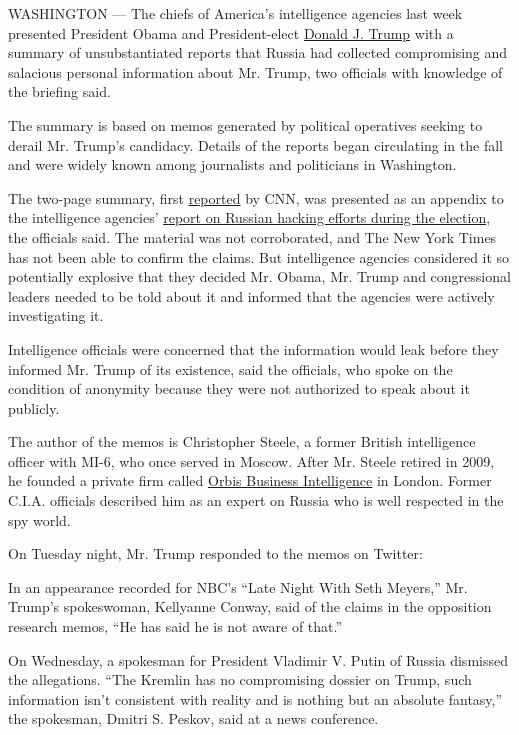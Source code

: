 WASHINGTON --- The chiefs of America's intelligence agencies last week
presented President Obama and President-elect
\href{http://www.nytimes.com/topic/person/donald-trump?inline=nyt-per}{Donald
J. Trump} with a summary of unsubstantiated reports that Russia had
collected compromising and salacious personal information about Mr.
Trump, two officials with knowledge of the briefing said.

The summary is based on memos generated by political operatives seeking
to derail Mr. Trump's candidacy. Details of the reports began
circulating in the fall and were widely known among journalists and
politicians in Washington.

The two-page summary, first
\href{http://edition.cnn.com/2017/01/10/politics/donald-trump-intelligence-report-russia/index.html}{reported}
by CNN, was presented as an appendix to the intelligence agencies'
\href{https://www.nytimes.com/2017/01/06/us/politics/donald-trump-wall-hack-russia.html}{report
on Russian hacking efforts during the election}, the officials said. The
material was not corroborated, and The New York Times has not been able
to confirm the claims. But intelligence agencies considered it so
potentially explosive that they decided Mr. Obama, Mr. Trump and
congressional leaders needed to be told about it and informed that the
agencies were actively investigating it.

Intelligence officials were concerned that the information would leak
before they informed Mr. Trump of its existence, said the officials, who
spoke on the condition of anonymity because they were not authorized to
speak about it publicly.

The author of the memos is Christopher Steele, a former British
intelligence officer with MI-6, who once served in Moscow. After Mr.
Steele retired in 2009, he founded a private firm called
\href{https://orbisbi.com/}{Orbis Business Intelligence} in London.
Former C.I.A. officials described him as an expert on Russia who is well
respected in the spy world.

On Tuesday night, Mr. Trump responded to the memos on Twitter:

In an appearance recorded for NBC's ``Late Night With Seth Meyers,'' Mr.
Trump's spokeswoman, Kellyanne Conway, said of the claims in the
opposition research memos, ``He has said he is not aware of that.''

On Wednesday, a spokesman for President Vladimir V. Putin of Russia
dismissed the allegations. ``The Kremlin has no compromising dossier on
Trump, such information isn't consistent with reality and is nothing but
an absolute fantasy,'' the spokesman, Dmitri S. Peskov, said at a news
conference.

